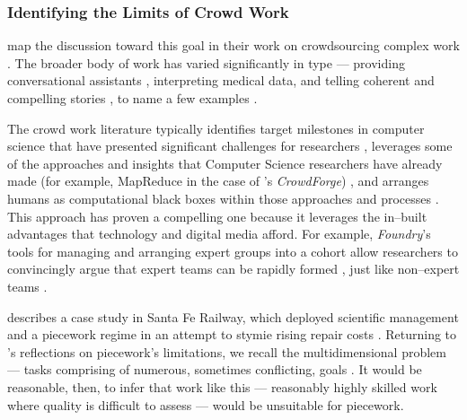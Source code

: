 \documentclass[trackingWork]{subfiles}
\begin{document}
\subsubsection[what are the limits of crowd work]{Identifying the Limits of Crowd Work}\label{sec:complexity}
\subsubsubsection{\crowdworkpers}
\citeauthor{crowdForgeKittur}
map the discussion toward this goal in their work on
crowdsourcing complex work
\cite{crowdForgeKittur}.
The broader body of work has varied significantly in type
--- providing conversational assistants%
, interpreting medical data, and
telling coherent and compelling stories%
, to name a few examples
\cite{Lasecki:2013:CCC:2501988.2502057,mavandadi2012distributed,KimStoria}.


The crowd work literature typically identifies target milestones in computer science
that have presented significant challenges for researchers%
, leverages some of the approaches and insights that Computer Science researchers have already made
(for example, MapReduce in the case of \citeauthor{crowdForgeKittur}'s \textit{CrowdForge})%
, and arranges humans as computational black boxes within those approaches and processes
\cite[][and others]{crowdForgeKittur,foundry}.
This approach has proven a compelling one because
it leverages the in--built advantages that technology and digital media afford.
For example, \textit{Foundry}'s tools for managing and arranging expert groups into a cohort
allow researchers to convincingly argue that expert teams can be rapidly formed%
, just like non--expert teams
\cite{foundry}.



\subsubsubsection{\pieceworkpers}
\citeauthor{10.2307/23702539} describes a case study in Santa Fe Railway, which
deployed scientific management and a piecework regime in an attempt to stymie rising repair costs
\cite{10.2307/23702539}.
Returning to \citeauthor{hart2016rise}'s reflections on piecework's limitations,
we recall the multidimensional problem
--- tasks comprising of numerous, sometimes conflicting, goals
\cite{hart2016rise}.
It would be reasonable, then, to infer that work like this
--- reasonably highly skilled work where quality is difficult to assess ---
would be unsuitable for piecework. 
\end{document}
